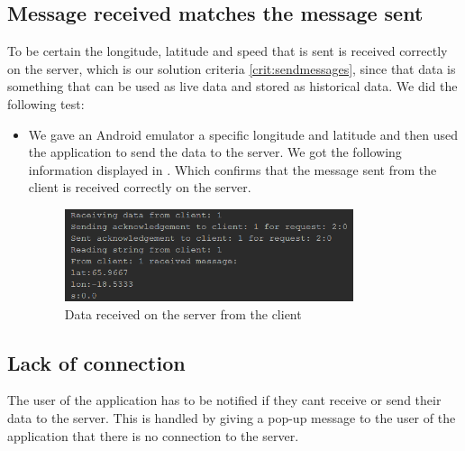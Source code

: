 \subsection{Message received matches the message sent}
To be certain the longitude, latitude and speed that is sent is received correctly on the server, which is our solution criteria \ref{crit:sendmessages}, since that data is something that can be used as live data and stored as historical data. We did the following test:
\begin{itemize}
	\item We gave an Android emulator a specific longitude and latitude and then used the application to send the data to the server. We got the following information displayed in . Which confirms that the message sent from the client is received correctly on the server.
	\begin{figure}[h!]
  \centering
    \includegraphics[width=0.8\textwidth]{figures/datasentfromclienttoserver.png}
    \caption{Data received on the server from the client}
    \label{fig:datasentfromclienttoserver}
\end{figure}
\end{itemize}


\subsection{Lack of connection}
The user of the application has to be notified if they cant receive or send their data to the server. This is handled by giving a pop-up message to the user of the application that there is no connection to the server.

